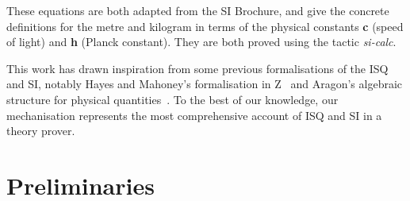 \documentclass[11pt,a4paper]{book}
\begin{document}
These equations are both adapted from the SI Brochure, and give the concrete definitions for the metre and kilogram in
terms of the physical constants \textbf{c} (speed of light) and \textbf{h} (Planck constant). They are both proved
using the tactic \textit{si-calc}.

This work has drawn inspiration from some previous formalisations of the ISQ and SI, notably Hayes and Mahoney's
formalisation in Z~\cite{HayesBrendan95} and Aragon's algebraic structure for physical
quantities~\cite{Aragon2004-SI}. To the best of our knowledge, our mechanisation represents the most comprehensive
account of ISQ and SI in a theory prover.


%

\chapter{Preliminaries}





\end{document}
